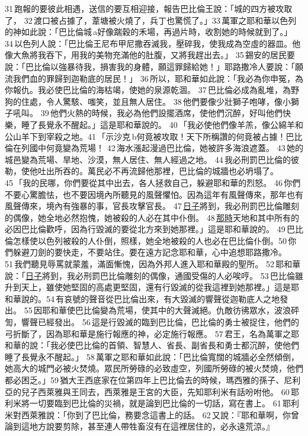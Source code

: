 31 跑報的要彼此相遇，送信的要互相迎接，報告巴比倫王說：「城的四方被攻取了， 32 渡口被占據了，葦塘被火燒了，兵丁也驚慌了。」33 萬軍之耶和華以色列的神如此說：「巴比倫城 a好像踹穀的禾場，再過片時，收割她的時候就到了。」 34 以色列人說：「巴比倫王尼布甲尼撒吞滅我，壓碎我，使我成為空虛的器皿。他像大魚將我吞下，用我的美物充滿他的肚腹，又將我趕出去。」 35 錫安的居民要說：「巴比倫以強暴待我，損害我的身體，願這罪歸給她！」耶路撒冷人要說：「願流我們血的罪歸到迦勒底的居民！」 36 所以，耶和華如此說：「我必為你申冤，為你報仇。我必使巴比倫的海枯竭，使她的泉源乾涸。 37 巴比倫必成為亂堆，為野狗的住處，令人驚駭、嗤笑，並且無人居住。 38 他們要像少壯獅子咆哮，像小獅子吼叫。 39 他們火熱的時候，我必為他們設擺酒席，使他們沉醉，好叫他們快樂，睡了長覺永不醒起。」這是耶和華說的。 40 「我必使他們像羊羔，像公綿羊和公山羊下到宰殺之地。41 「示沙克 b何竟被攻取！天下所稱讚的何竟被占據！巴比倫在列國中何竟變為荒場！ 42 海水漲起漫過巴比倫，她被許多海浪遮蓋。 43 她的城邑變為荒場、旱地、沙漠，無人居住、無人經過之地。 44 我必刑罰巴比倫的彼勒，使他吐出所吞的。萬民必不再流歸他那裡，巴比倫的城牆也必坍塌了。45 「我的民哪，你們要從其中出去，各人拯救自己，躲避耶和華的烈怒。 46 你們不要心驚膽怯，也不要因境內所聽見的風聲懼怕。因為這年有風聲傳來，那年也有風聲傳來，境內有強暴的事，官長攻擊官長。 47 \underline{日子}將到，我必刑罰巴比倫雕刻的偶像，她全地必然抱愧，她被殺的人必在其中仆倒。 48 \underline{那時}天地和其中所有的必因巴比倫歡呼，因為行毀滅的要從北方來到她那裡。」這是耶和華說的。 49 巴比倫怎樣使以色列被殺的人仆倒，照樣，她全地被殺的人也必在巴比倫仆倒。50 你們躲避刀劍的要快走，不要站住。要在遠方記念耶和華，心中追想耶路撒冷。 51 我們聽見辱罵就蒙羞，滿面慚愧，因為外邦人進入耶和華殿的聖所。 52 耶和華說：「\underline{日子}將到，我必刑罰巴比倫雕刻的偶像，通國受傷的人必唉哼。 53 巴比倫雖升到天上，雖使她堅固的高處更堅固，還有行毀滅的從我這裡到她那裡。」這是耶和華說的。54 有哀號的聲音從巴比倫出來，有大毀滅的響聲從迦勒底人之地發出。 55 因耶和華使巴比倫變為荒場，使其中的大聲滅絕。仇敵彷彿眾水，波浪砰訇，響聲已經發出。 56 這是行毀滅的臨到巴比倫，巴比倫的勇士被捉住，他們的弓折斷了，因為耶和華是施行報應的神，必定施行報應。 57 君王，名為萬軍之耶和華的說：「我必使巴比倫的首領、智慧人、省長、副省長和勇士都沉醉，使他們睡了長覺永不醒起。」 58 萬軍之耶和華如此說：「巴比倫寬闊的城牆必全然傾倒，她高大的城門必被火焚燒。眾民所勞碌的必致虛空，列國所勞碌的被火焚燒，他們都必困乏。」59 猶大王西底家在位第四年上巴比倫去的時候，瑪西雅的孫子、尼利亞的兒子西萊雅與王同去，西萊雅是王宮的大臣，先知耶利米有話吩咐他。 60 耶利米將一切要臨到巴比倫的災禍，就是論到巴比倫的一切話，寫在書上。 61 耶利米對西萊雅說：「你到了巴比倫，務要念這書上的話。 62 又說：『耶和華啊，你曾論到這地方說要剪除，甚至連人帶牲畜沒有在這裡居住的，必永遠荒涼。』




